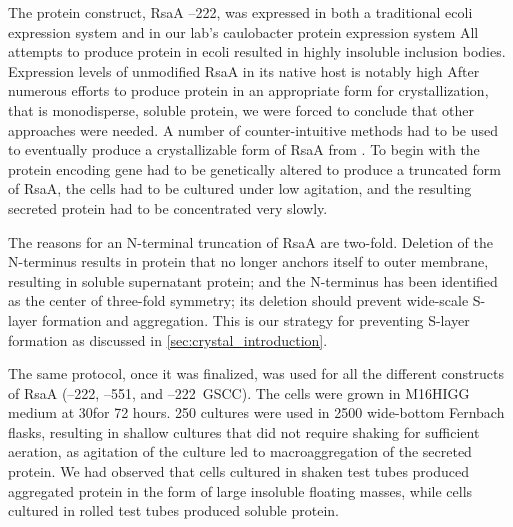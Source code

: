 The protein construct, RsaA --222, was expressed in both a traditional
\acl{ecoli} expression system and in our lab's \ac{caulobacter}
protein expression system
 All attempts to produce protein in \ac{ecoli}
resulted in highly insoluble inclusion bodies.
 Expression levels of unmodified RsaA in its native host is notably high 
After numerous efforts to produce protein in an appropriate form for
crystallization, that is monodisperse, soluble protein, we were forced to conclude that other approaches were needed. A number of
counter-intuitive methods had to be used to eventually produce a crystallizable form of
RsaA from \caulobacter. To begin with the protein encoding gene had to be genetically altered
to produce a truncated form of RsaA, the cells had to be cultured under low
agitation, and the resulting secreted protein had to be concentrated very slowly.

The reasons for an N-terminal truncation of RsaA are two-fold. Deletion
of the N-terminus results in protein that no longer anchors itself to
outer membrane, resulting in soluble supernatant protein; and the
N-terminus has been identified as the center of three-fold symmetry; its
deletion should prevent wide-scale \ac{S-layer} formation and aggregation. This is our strategy for preventing \ac{S-layer} formation as discussed in \cref{sec:crystal_introduction}.

The same protocol, once it was finalized, was used for all the different constructs of RsaA (--222, --551, and --222~GSCC).
The cells were grown in M16HIGG medium
at 30\cel for 72 hours. 250 \millilitre cultures
were used in 2500 \millilitre wide-bottom Fernbach flasks, resulting in shallow
cultures that did not require shaking for sufficient aeration, as
agitation of the culture led to macroaggregation of the secreted
protein. We had observed that cells cultured in shaken test tubes produced
aggregated protein in the form of large insoluble floating masses, while cells cultured in rolled test tubes produced soluble
protein.

